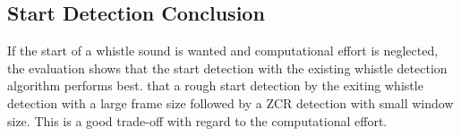 \subsection{Start Detection Conclusion}
\label{subsec:04_startDetectionConclusion}

If the start of a whistle sound is wanted and computational effort is
neglected, the evaluation shows that the start detection with the
existing whistle detection algorithm performs best.
that a rough start detection by the exiting whistle detection
with a large frame size followed by a \ac{ZCR} detection with small
window size.
This is a good trade-off with regard to the computational effort.
